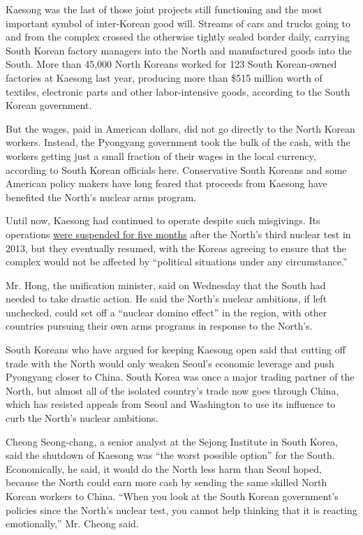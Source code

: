 Kaesong was the last of those joint projects still functioning and the
most important symbol of inter-Korean good will. Streams of cars and
trucks going to and from the complex crossed the otherwise tightly
sealed border daily, carrying South Korean factory managers into the
North and manufactured goods into the South. More than 45,000 North
Koreans worked for 123 South Korean-owned factories at Kaesong last
year, producing more than \$515 million worth of textiles, electronic
parts and other labor-intensive goods, according to the South Korean
government.

But the wages, paid in American dollars, did not go directly to the
North Korean workers. Instead, the Pyongyang government took the bulk of
the cash, with the workers getting just a small fraction of their wages
in the local currency, according to South Korean officials here.
Conservative South Koreans and some American policy makers have long
feared that proceeds from Kaesong have benefited the North's nuclear
arms program.

Until now, Kaesong had continued to operate despite such misgivings. Its
operations
\href{http://www.nytimes3xbfgragh.onion/2013/05/04/world/asia/last-south-koreans-leave-industrial-park-in-north.html}{were
suspended for five months} after the North's third nuclear test in 2013,
but they eventually resumed, with the Koreas agreeing to ensure that the
complex would not be affected by ``political situations under any
circumstance.''

Mr. Hong, the unification minister, said on Wednesday that the South had
needed to take drastic action. He said the North's nuclear ambitions, if
left unchecked, could set off a ``nuclear domino effect'' in the region,
with other countries pursuing their own arms programs in response to the
North's.

South Koreans who have argued for keeping Kaesong open said that cutting
off trade with the North would only weaken Seoul's economic leverage and
push Pyongyang closer to China. South Korea was once a major trading
partner of the North, but almost all of the isolated country's trade now
goes through China, which has resisted appeals from Seoul and Washington
to use its influence to curb the North's nuclear ambitions.

Cheong Seong-chang, a senior analyst at the Sejong Institute in South
Korea, said the shutdown of Kaesong was ``the worst possible option''
for the South. Economically, he said, it would do the North less harm
than Seoul hoped, because the North could earn more cash by sending the
same skilled North Korean workers to China. ``When you look at the South
Korean government's policies since the North's nuclear test, you cannot
help thinking that it is reacting emotionally,'' Mr. Cheong said.

